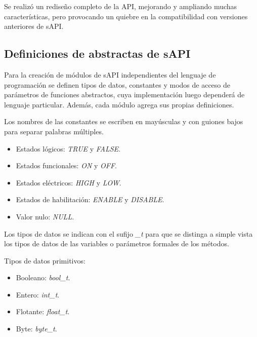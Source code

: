 Se realizó un rediseño completo de la API, mejorando y ampliando muchas características, pero provocando un quiebre en la compatibilidad con versiones anteriores de sAPI.

\subsection{Definiciones de abstractas de sAPI}

Para la creación de módulos de sAPI independientes del lenguaje de programación se definen tipos de datos, constantes y modos de acceso de parámetros de funciones abstractos, cuya implementación luego dependerá de lenguaje particular. Además, cada módulo agrega sus propias definiciones.


Los nombres de las constantes se escriben en mayúsculas y con guiones bajos para separar palabras múltiples. 

\begin{itemize}
\item
Estados lógicos: \emph{TRUE} y \emph{FALSE}.
\item
Estados funcionales: \emph{ON} y \emph{OFF}.
\item
Estados eléctricos: \emph{HIGH} y \emph{LOW}.
\item
Estados de habilitación: \emph{ENABLE} y \emph{DISABLE}.
\item
Valor nulo: \emph{NULL}.
\end{itemize}


Los tipos de datos se indican con el sufijo \emph{\_t} para que se distinga a simple vista los tipos de datos de las variables o parámetros formales de los métodos.

Tipos de datos primitivos:

\begin{itemize}
\item
Booleano: \emph{bool\_t}. 
\item
Entero: \emph{int\_t}.
\item
Flotante: \emph{float\_t}.
\item
Byte: \emph{byte\_t}.
\end{itemize}

